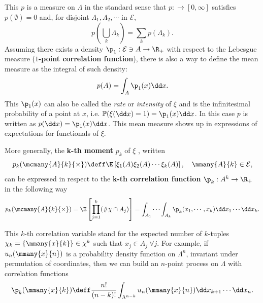 This $p$ is a measure on $\Lambda$ in the standard sense that $p : \mathcal \rightarrow [0, \infty]$ satisfies $p(\emptyset) = 0$ and, for disjoint $\Lambda_1, \Lambda_2, \cdots$ in $\mathcal{E}$, 
\begin{equation}
	p\left( \bigcup_k \Lambda_k \right) = \sum_k p(\Lambda_k).
\end{equation} 
Assuming there exists a density $\p_1: \mathcal{E} \ni A \rightarrow \R_+$ with respect to the Lebesgue measure (\textbf{$1$-point correlation function}), there is also a way to define the mean measure as the integral of such density:
\begin{equation}
	p(A) = \int_A \p_1(x) \dd x.
\end{equation}
This $\p_1(x)$ can also be called the \textit{rate} or \textit{intensity} of $\xi$ and is the infinitesimal probability of a point at $x$, i.e. $\mathbb{P}(\xi(\dd x) = 1) = \p_1(x) \dd x$. In this case $p$ is written as $p(\dd x) = \p_1(x) \dd x$. This mean measure shows up in expressions of expectations for functionals of $\xi$. 
\begin{definicao}
	More generally, the \textbf{k-th moment} $p_k$ of $\xi$ , written
	\begin{equation}
		p_k(\mcmany{A}{k}{\times}) \deff \E \left[ \xi_1(A) \xi_2(A)\cdots \xi_k(A) \right], \quad \mmany{A}{k} \in \mathcal{E},
	\end{equation}
	can be expressed in respect to the \textbf{k-th correlation function} $\p_k: A^k \rightarrow \R_+$ in the following way
	\begin{equation}
		p_k(\mcmany{A}{k}{\times}) = \E \left[ \prod_{j=1}^{k} (\# \chi \cap A_j) \right]= \int_{A_1} \cdots \int_{A_k} \p_k(x_1, \cdots, x_k) \dd x_1 \cdots \dd x_k.
		\label{Equation: kth moment measure}
	\end{equation}
\end{definicao}
This $k$-th correlation variable stand for the expected number of $k$-tuples $\chi_k = \{\mmany{x}{k}\} \in \chi^k$ such that $x_j \in A_j\ \forall j.$ For example, if $u_n(\mmany{x}{n})$ is a probability density function on $\Lambda^n$, invariant under permutation of coordinates, then we can build an $n$-point process on $\Lambda$ with correlation functions
\begin{equation}
	\p_k(\mmany{x}{k}) \deff \frac{n!}{(n-k)!} \int_{\Lambda^{n-k}} u_n(\mmany{x}{n}) \dd x_{k+1} \cdots \dd x_n.
	\label{Equation: Symmetric correlation}
\end{equation}

